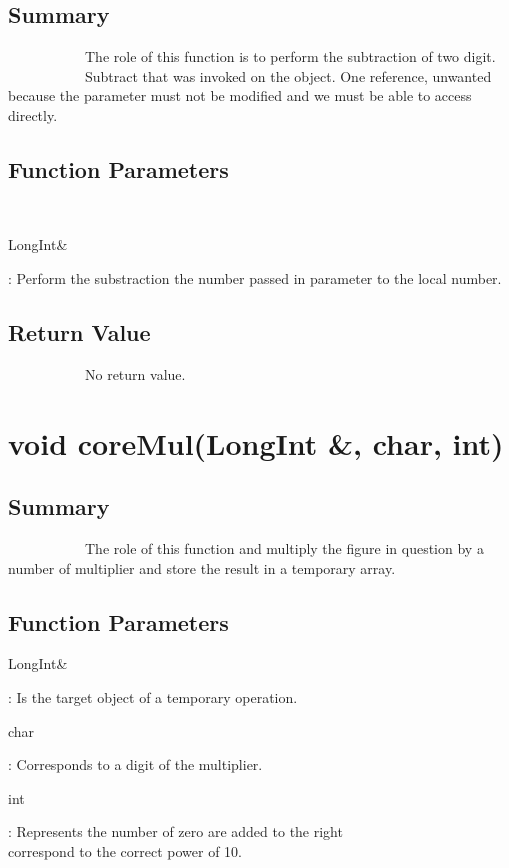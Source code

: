 \documentclass[11pt]{report}
\begin{document}
	\subsection{Summary}
~~~~~~~~~~~The role of this function is to perform the subtraction of two digit.
~~~~~~~~~~~Subtract that was invoked on the object.
One reference, unwanted because the parameter must not be modified and
we must be able to access directly.
	\subsection{Function Parameters}
~~~~~~~~~~~\begin{bf}LongInt\&\end{bf}: Perform the substraction the number passed in parameter to the local number.

	\subsection{Return Value}
~~~~~~~~~~~No return value.

\section{void coreMul(LongInt \&, char, int)}
	\subsection{Summary}
~~~~~~~~~~~The role of this function and multiply the figure in question by a number of multiplier
and store the result in a temporary array.
	\subsection{Function Parameters}
	\begin{tabbing} 
\begin{bf}LongInt\&\end{bf}: Is the target object of a temporary operation.\\
\begin{bf}char\end{bf}: Corresponds to a digit of the multiplier.\\
\begin{bf}int\end{bf}: Represents the number of zero are added to the right\\
correspond to the correct power of 10.
	\end{tabbing} 
\end{document}
